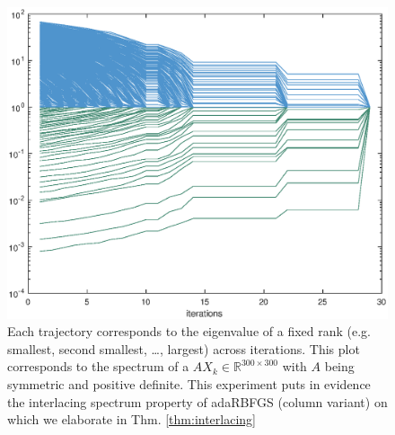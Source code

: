 \documentclass[12pt,conference,compsocconf]{IEEEtran}
\newcommand{\R}{\mathbb{R}}
\begin{document}
\begin{figure}
  \centering
  \includegraphics[height=0.8\columnwidth,width=1.0\columnwidth]{interlacing.eps}
  \vspace{-6mm}
  \caption{Each trajectory corresponds to the eigenvalue of a fixed rank (e.g. smallest, second smallest, \ldots, largest) across iterations. This plot corresponds to the spectrum of a $AX_k \in \R^{300\times300}$ with $A$ being symmetric and positive definite. This experiment puts in evidence the interlacing spectrum property of adaRBFGS (column variant) on which we elaborate in Thm. \ref{thm:interlacing} \label{fig:interlacing}}
\end{figure}
\end{document}

